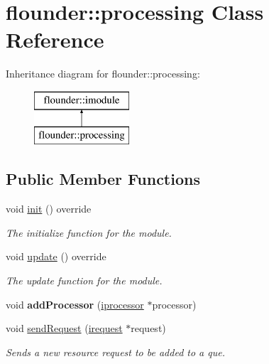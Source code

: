 \hypertarget{classflounder_1_1processing}{}\section{flounder\+:\+:processing Class Reference}
\label{classflounder_1_1processing}
Inheritance diagram for flounder\+:\+:processing\+:\begin{figure}[H]
\begin{center}
\leavevmode
\includegraphics[height=2.000000cm]{classflounder_1_1processing}
\end{center}
\end{figure}
\subsection*{Public Member Functions}
\begin{DoxyCompactItemize}
\item 
void \hyperlink{classflounder_1_1processing_a5c9545d8a02d836bc198982750f24f49}{init} () override
\begin{DoxyCompactList}\small\item\em The initialize function for the module. \end{DoxyCompactList}\item 
void \hyperlink{classflounder_1_1processing_ac096299eb1b5b67739586900710d4206}{update} () override
\begin{DoxyCompactList}\small\item\em The update function for the module. \end{DoxyCompactList}\item 
\mbox{\label{classflounder_1_1processing_a9ae5080b9ed1099aae8db7db034c9eee}} 
void {\bfseries add\+Processor} (\hyperlink{classflounder_1_1iprocessor}{iprocessor} $\ast$processor)
\item 
void \hyperlink{classflounder_1_1processing_addb84aad44d50ae3fa9513cddcea9968}{send\+Request} (\hyperlink{classflounder_1_1irequest}{irequest} $\ast$request)
\begin{DoxyCompactList}\small\item\em Sends a new resource request to be added to a que. \end{DoxyCompactList}\end{DoxyCompactItemize}
